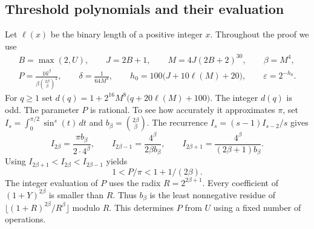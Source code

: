 \documentclass[11pt,letterpaper]{article}
\numberwithin{equation}{section}
\begin{document}
\subsection{Threshold polynomials and their evaluation}

Let $\ell(x)$ be the binary length of a positive integer $x$. Throughout the proof we use
\begin{equation}\label{eq:packing-grid}
 \begin{gathered}
 B=\max(2,U),\qquad J=2B+1,\qquad M=4J(2B+2)^{30},\qquad \beta=M^4,\\
 P=\frac{16^\beta}{\beta\binom{2\beta}{\beta}^{2}},\qquad
 \delta=\frac{1}{64M^4},\qquad
 h_0=100\bigl(J+10\ell(M)+20\bigr),\qquad \varepsilon=2^{-h_0}.
 \end{gathered}
\end{equation}
For $q\ge1$ set $d(q)=1+2^{16}M^8\bigl(q+20\ell(M)+100\bigr)$.
The integer $d(q)$ is odd. The parameter $P$ is rational. To see how
accurately it approximates $\pi$, set
$I_s=\int_0^{\pi/2}\sin^s(t)\,dt$ and
$b_\beta=\binom{2\beta}{\beta}$. The recurrence
$I_s=(s-1)I_{s-2}/s$ gives
\[
 I_{2\beta}=\frac{\pi b_\beta}{2\cdot 4^\beta},\qquad
 I_{2\beta-1}=\frac{4^\beta}{2\beta b_\beta},\qquad
 I_{2\beta+1}=\frac{4^\beta}{(2\beta+1)b_\beta}.
\]
Using $I_{2\beta+1}<I_{2\beta}<I_{2\beta-1}$ yields
\begin{equation}
 1<P/\pi<1+1/(2\beta).
 \label{eq:packing-wallis}
\end{equation}
The integer evaluation of $P$ uses the radix $R=2^{2\beta+1}$.
Every coefficient of $(1+Y)^{2\beta}$ is smaller than $R$.
Thus $b_\beta$ is the least nonnegative residue of
$\lfloor(1+R)^{2\beta}/R^\beta\rfloor$ modulo $R$.
This determines $P$ from $U$ using a fixed number of operations.
\end{document}
